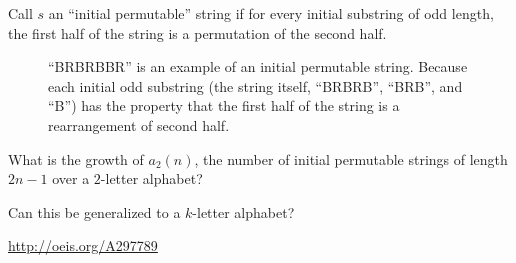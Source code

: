 \documentclass{article}
\begin{document}
Call $s$ an ``initial permutable'' string if for every initial substring of
odd length, the first half of the string is a permutation of the second half.
\begin{figure}[!h]
  \centering
  \caption{
    ``BRBRBBR'' is an example of an initial permutable string. Because each
    initial odd substring (the string itself, ``BRBRB'', ``BRB'', and ``B'')
    has the property that the first half of the string is a rearrangement of
    second half.
  }
\end{figure}

\begin{question}
  What is the growth of $a_2(n)$, the number of initial permutable strings of
  length $2n - 1$ over a $2$-letter alphabet?
\end{question}
\begin{related}
  \item Can this be generalized to a $k$-letter alphabet?
\end{related}
\begin{references}
  \item \url{http://oeis.org/A297789}
\end{references}
\end{document}
